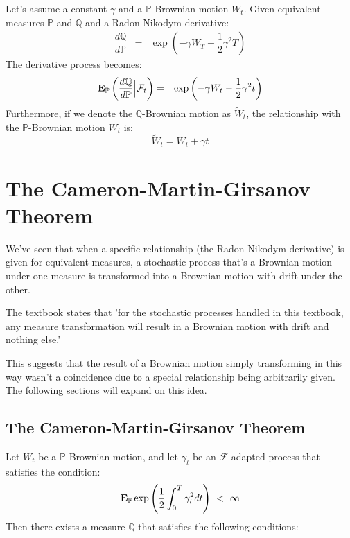 \documentclass[uplatex,a4j,12pt,dvipdfmx]{jsarticle}
\begin{document}
${}$


Let's assume a constant $\gamma$ and a $\mathbb{P}$-Brownian motion $W_{t}$.
Given equivalent measures $\mathbb{P}$ and $\mathbb{Q}$ and a Radon-Nikodym derivative:
%
\begin{eqnarray*}
	\dfrac{ d \mathbb{Q} }{ d \mathbb{P} }
	&=&
	\exp \left( - \gamma W_{T} - \dfrac{1}{2} \gamma^{2} T \right)
\end{eqnarray*}
%
The derivative process becomes:
%
\begin{eqnarray*}
	{\bf E}_{\mathbb{P}}
	\left( \dfrac{ d \mathbb{Q} }{ d \mathbb{P} } \Big| \mathcal{F}_{t} \right)
	&=&
	\exp \left( - \gamma W_{t} - \dfrac{1}{2} \gamma^{2} t \right)
\end{eqnarray*}
%
Furthermore, if we denote the $\mathbb{Q}$-Brownian motion as $\tilde{W}_{t}$, the relationship with the $\mathbb{P}$-Brownian motion $W_{t}$ is:
$$
	\tilde{W}_{t} = W_{t} + \gamma t
$$
\section{The Cameron-Martin-Girsanov Theorem}

We've seen that when a specific relationship (the Radon-Nikodym derivative) is given for equivalent measures, a stochastic process that's a Brownian motion under one measure is transformed into a Brownian motion with drift under the other.

The textbook states that 'for the stochastic processes handled in this textbook, any measure transformation will result in a Brownian motion with drift and nothing else.'

This suggests that the result of a Brownian motion simply transforming in this way wasn't a coincidence due to a special relationship being arbitrarily given. The following sections will expand on this idea.

\subsection{The Cameron-Martin-Girsanov Theorem}

Let $W_{t}$ be a $\mathbb{P}$-Brownian motion, and let $\gamma_{t}$ be an $\mathcal{F}$-adapted process that satisfies the condition:
$$
	{\bf E}_{\mathbb{P}} \exp \left( \dfrac{1}{2} \int^{T}_{0} \gamma_{t}^{2} dt \right)
	\ < \
	\infty
$$
Then there exists a measure $\mathbb{Q}$ that satisfies the following conditions:
\end{document}
